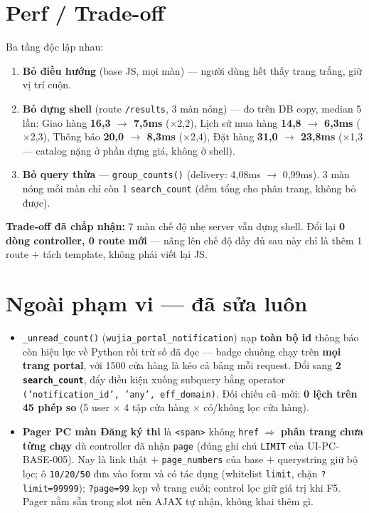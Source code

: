 \section{Perf / Trade-off}

Ba tầng độc lập nhau:

\begin{enumerate}
  \item \textbf{Bỏ điều hướng} (base JS, mọi màn) --- người dùng hết thấy trang trắng, giữ vị
    trí cuộn.
  \item \textbf{Bỏ dựng shell} (route \texttt{/results}, 3 màn nóng) --- đo trên DB copy, median
    5 lần: Giao hàng \textbf{16{,}3 $\to$ 7{,}5ms} ($\times$2{,}2), Lịch sử mua hàng
    \textbf{14{,}8 $\to$ 6{,}3ms} ($\times$2{,}3), Thông báo \textbf{20{,}0 $\to$ 8{,}3ms}
    ($\times$2{,}4), Đặt hàng \textbf{31{,}0 $\to$ 23{,}8ms} ($\times$1{,}3 --- catalog nặng ở
    phần dựng giá, không ở shell).
  \item \textbf{Bỏ query thừa} --- \texttt{group\_counts()} (delivery: 4{,}08ms $\to$ 0{,}99ms).
    3 màn nóng mỗi màn chỉ còn 1 \texttt{search\_count} (đếm tổng cho phân trang, không bỏ được).
\end{enumerate}

\textbf{Trade-off đã chấp nhận:} 7 màn chế độ nhẹ server vẫn dựng shell. Đổi lại
\textbf{0 dòng controller, 0 route mới} --- nâng lên chế độ đầy đủ sau này chỉ là thêm 1 route
$+$ tách template, không phải viết lại JS.

\section{Ngoài phạm vi --- đã sửa luôn}\label{sec:s49-ngoaipv}

\begin{itemize}
  \item \texttt{\_unread\_count()} (\texttt{wujia\_portal\_notification}) nạp \textbf{toàn bộ id}
    thông báo còn hiệu lực về Python rồi trừ số đã đọc --- badge chuông chạy trên
    \textbf{mọi trang portal}, với 1500 cửa hàng là kéo cả bảng mỗi request. Đổi sang
    \textbf{2 \texttt{search\_count}}, đẩy điều kiện xuống subquery bằng operator
    \texttt{('notification\_id', 'any', eff\_domain)}. Đối chiếu cũ--mới:
    \textbf{0 lệch trên 45 phép so} (5 user $\times$ 4 tập cửa hàng $\times$ có/không lọc cửa hàng).
  \item \textbf{Pager PC màn Đăng ký thi} là \texttt{<span>} không \texttt{href} $\Rightarrow$
    \textbf{phân trang chưa từng chạy} dù controller đã nhận \texttt{page} (đúng ghi chú
    \texttt{LIMIT} của UI-PC-BASE-005). Nay là link thật $+$ \texttt{page\_numbers} của base
    $+$ querystring giữ bộ lọc; ô \texttt{10/20/50} đưa vào form và có tác dụng (whitelist
    \texttt{limit}, chặn \texttt{?limit=99999}); \texttt{?page=99} kẹp về trang cuối; control
    lọc giữ giá trị khi F5. Pager nằm sẵn trong slot nên AJAX tự nhận, không khai thêm gì.
\end{itemize}

